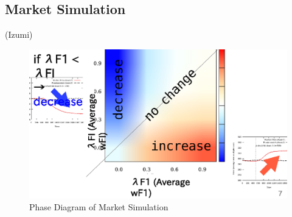 \subsection{Market Simulation}
\label{ss:Market Simulation}
(Izumi)

\begin{figure}
  \centering
  \includegraphics[width=.8\linewidth]{Figs.noda/figure-07.market_phase.eps}
  \caption{Phase Diagram of Market Simulation}
  \label{fig:Figs.noda/figure-07.market_phase.eps}
\end{figure}

